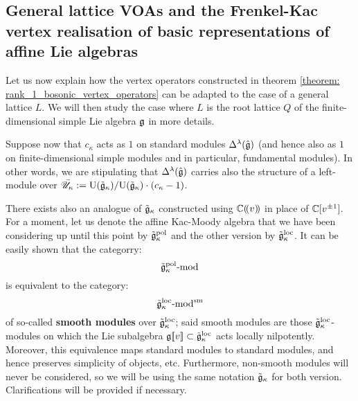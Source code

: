     \subsection{General lattice VOAs and the Frenkel-Kac vertex realisation of basic representations of affine Lie algebras}
        Let us now explain how the vertex operators constructed in theorem \ref{theorem: rank_1_bosonic_vertex_operators} can be adapted to the case of a general lattice $L$. We will then study the case where $L$ is the root lattice $Q$ of the finite-dimensional simple Lie algebra $\mathfrak{g}$ in more details.

        \begin{convention}
            Suppose now that $c_{\kappa}$ acts as $1$ on standard modules $\Delta^{\lambda}(\hat{\mathfrak{g}})$ (and hence also as $1$ on finite-dimensional simple modules and in particular, fundamental modules). In other words, we are stipulating that $\Delta^{\lambda}(\hat{\mathfrak{g}})$ carries also the structure of a left-module over $\bar{\mathscr{U}}_{\kappa} := \mathrm{U}(\tilde{\mathfrak{g}}_{\kappa})/\mathrm{U}(\tilde{\mathfrak{g}}_{\kappa}) \cdot (c_{\kappa} - 1)$.
        \end{convention}

        \begin{remark}
            There exists also an analogue of $\tilde{\mathfrak{g}}_{\kappa}$ constructed using $\mathbb{C}(\!(v)\!)$ in place of $\mathbb{C}[v^{\pm 1}]$. For a moment, let us denote the affine Kac-Moody algebra that we have been considering up until this point by $\tilde{\mathfrak{g}}_{\kappa}^{\mathrm{pol}}$ and the other version by $\tilde{\mathfrak{g}}_{\kappa}^{\mathrm{loc}}$. It can be easily shown that the categorry:
                $$\tilde{\mathfrak{g}}_{\kappa}^{\mathrm{pol}}\text{-}\mathrm{mod}$$
            is equivalent to the category:
                $$\tilde{\mathfrak{g}}_{\kappa}^{\mathrm{loc}}\text{-}\mathrm{mod}^{\mathrm{sm}}$$
            of so-called \textbf{smooth modules} over $\tilde{\mathfrak{g}}_{\kappa}^{\mathrm{loc}}$; said smooth modules are those $\tilde{\mathfrak{g}}_{\kappa}^{\mathrm{loc}}$-modules on which the Lie subalgebra $\mathfrak{g}[\![v]\!] \subset \tilde{\mathfrak{g}}_{\kappa}^{\mathrm{loc}}$ acts locally nilpotently. Moreover, this equivalence maps standard modules to standard modules, and hence preserves simplicity of objects, etc. Furthermore, non-smooth modules will never be considered, so we will be using the same notation $\tilde{\mathfrak{g}}_{\kappa}$ for both version. Clarifications will be provided if necessary.
        \end{remark}

